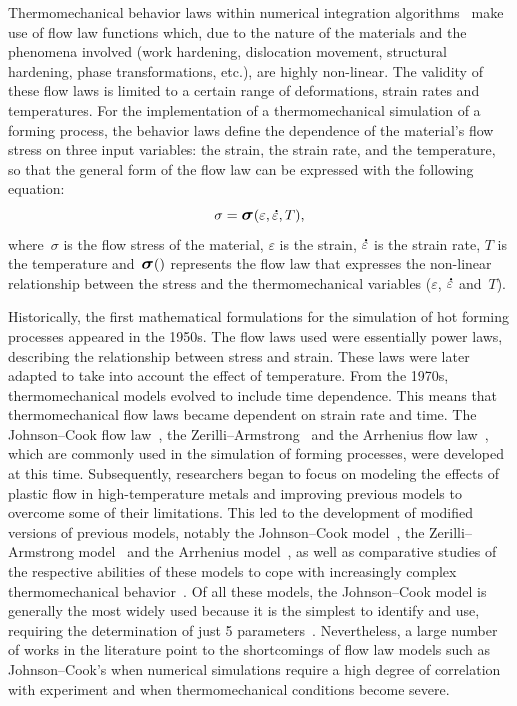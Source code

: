 \documentclass[algorithms,article,submit,pdftex,oneauthors]{Definitions/mdpi}
\DeclareRobustCommand{\mdot}[1]{\accentset{\mbox{\bfseries .}}{#1}}
\DeclareRobustCommand{\Sig}{\mbox{\large\ensuremath{\boldsymbol{\sigma}}}}
\begin{document}
Thermomechanical behavior laws within numerical integration algorithms~\cite{Ponthot-2002-USU} make use of flow law functions which, due to the nature of the materials and the phenomena involved (work hardening, dislocation movement, structural hardening, phase transformations, etc.), are highly non-linear.
The validity of these flow laws is limited to a certain range of deformations, strain rates and temperatures.
For the implementation of a thermomechanical simulation of a forming process, the behavior laws define the dependence of the material's flow stress on three input variables: the strain, the strain rate, and the temperature, so that the general form of the flow law can be expressed with the following equation:
\begin{equation}
\sigma = \Sig\left(\varepsilon, \mdot{\varepsilon}, T\right),\label{eq:GenFlow}
\end{equation}
where~$\sigma$ is the flow stress of the material, $\varepsilon$ is the strain, $\mdot{\varepsilon}$ is the strain rate, $T$ is the temperature and~$\Sig()$ represents the flow law that expresses the non-linear relationship between the stress and the thermomechanical variables ($\varepsilon$, $\mdot{\varepsilon}$ and~$T$).

Historically, the first mathematical formulations for the simulation of hot forming processes appeared in the 1950s.
The flow laws used were essentially power laws, describing the relationship between stress and strain.
These laws were later adapted to take into account the effect of temperature.
From the 1970s, thermomechanical models evolved to include time dependence.
This means that thermomechanical flow laws became dependent on strain rate and time.
The Johnson--Cook flow law~\cite{Johnson-1983-CMD}, the Zerilli--Armstrong~\cite{Zerilli-1987-DMB} and the Arrhenius flow law~\cite{Jonas-1969}, which are commonly used in the simulation of forming processes, were developed at this time.
Subsequently, researchers began to focus on modeling the effects of plastic flow in high-temperature metals and improving previous models to overcome some of their limitations.
This led to the development of modified versions of previous models, notably the Johnson--Cook model~\cite{Duc-Toan-2012-MJC, Li-2013-MJC, Zhang-2015}, the Zerilli--Armstrong model~\cite{He-2014-MZA, Gurusamy-2017-OTP, Yu-2020-FSM} and the Arrhenius model~\cite{Zhan-2014-CMF, Liang-2022}, as well as comparative studies of the respective abilities of these models to cope with increasingly complex thermomechanical behavior~\cite{Liu-2020-FSP}.
Of all these models, the Johnson--Cook model is generally the most widely used because it is the simplest to identify and use, requiring the determination of just 5 parameters~\cite{Zeng-2022-TCR}.
Nevertheless, a large number of works in the literature point to the shortcomings of flow law models such as Johnson--Cook's when numerical simulations require a high degree of correlation with experiment and when thermomechanical conditions become severe.
\end{document}
